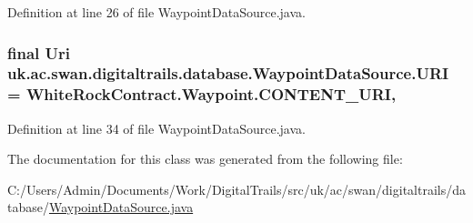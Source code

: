 Definition at line 26 of file Waypoint\+Data\+Source.\+java.

\hypertarget{classuk_1_1ac_1_1swan_1_1digitaltrails_1_1database_1_1_waypoint_data_source_a5f8ecac9d7b948c37264b81ed8995911}{
\subsubsection[{U\+R\+I}]{\setlength{\rightskip}{0pt plus 5cm}final Uri uk.\+ac.\+swan.\+digitaltrails.\+database.\+Waypoint\+Data\+Source.\+U\+R\+I = {\bf White\+Rock\+Contract.\+Waypoint.\+C\+O\+N\+T\+E\+N\+T\+\_\+\+U\+R\+I}\hspace{0.3cm}{\ttfamily [static]}, {\ttfamily [private]}}}\label{classuk_1_1ac_1_1swan_1_1digitaltrails_1_1database_1_1_waypoint_data_source_a5f8ecac9d7b948c37264b81ed8995911}


Definition at line 34 of file Waypoint\+Data\+Source.\+java.



The documentation for this class was generated from the following file\+:\begin{DoxyCompactItemize}
\item 
C\+:/\+Users/\+Admin/\+Documents/\+Work/\+Digital\+Trails/src/uk/ac/swan/digitaltrails/database/\hyperlink{_waypoint_data_source_8java}{Waypoint\+Data\+Source.\+java}\end{DoxyCompactItemize}
